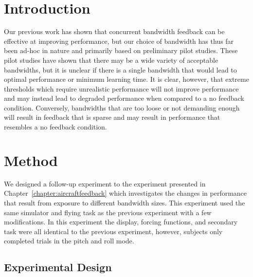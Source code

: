 \section{Introduction}

Our previous work has shown that concurrent bandwidth feedback can be effective at improving performance, but our choice of bandwidth has thus far been ad-hoc in nature and primarily based on preliminary pilot studies.
These pilot studies have shown that there may be a wide variety of acceptable bandwidths, but it is unclear if there is a single bandwidth that would lead to optimal performance or minimum learning time.
It is clear, however, that extreme thresholds which require unrealistic performance will not improve performance and may instead lead to degraded performance when compared to a no feedback condition.
Conversely, bandwidths that are too loose or not demanding enough will result in feedback that is sparse and may result in performance that resembles a no feedback condition.

\section{Method}

We designed a follow-up experiment to the experiment presented in Chapter~\ref{chapter:aircraftfeedback} which investigates the changes in performance that result from exposure to different bandwidth sizes.
This experiment used the same simulator and flying task as the previous experiment with a few modifications.
In this experiment the display, forcing functions, and secondary task were all identical to the previous experiment, however, subjects only completed trials in the pitch and roll mode.

\subsection{Experimental Design}

